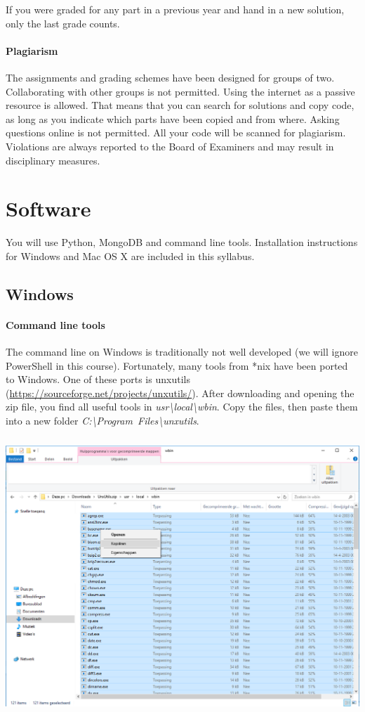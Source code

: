 \documentclass[a4paper]{report}
\newcommand{\blankline}{\par\vspace{5mm}}
\begin{document}
If you were graded for any part in a previous year and hand in a new solution, only the last grade counts.

\paragraph{Plagiarism}
The assignments and grading schemes have been designed for groups of two. Collaborating with other groups is not permitted. Using the internet as a passive resource is allowed. That means that you can search for solutions and copy code, as long as you indicate which parts have been copied and from where. Asking questions online is not permitted. All your code will be scanned for plagiarism. Violations are always reported to the Board of Examiners and may result in disciplinary measures.

\blankline

\section*{Software}
You will use Python, MongoDB and command line tools. Installation instructions for Windows and Mac OS X are included in this syllabus.

\subsection*{Windows}
\paragraph{Command line tools}
The command line on Windows is traditionally not well developed (we will
ignore PowerShell in this course). Fortunately, many tools from *nix
have been ported to Windows. One of these ports is \mbox{unxutils}
(\url{https://sourceforge.net/projects/unxutils/}). After downloading
and opening the zip file, you find all useful tools in
\textit{usr{\textbackslash}local{\textbackslash}wbin}. Copy the files,
then paste them into a new folder \textit{C:{\textbackslash}Program~Files{\textbackslash}unxutils}.

\noindent\begin{center}\includegraphics[width=5.552in,height=4.098in]{Syllabus-img1.png}\end{center}
\end{document}
